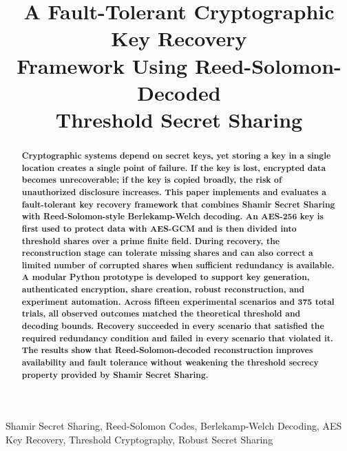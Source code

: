 \documentclass[conference]{IEEEtran}
\begin{document}

\title{A Fault-Tolerant Cryptographic Key Recovery\\
Framework Using Reed-Solomon-Decoded\\
Threshold Secret Sharing}

\author{
}

\maketitle
\thispagestyle{empty}
\vspace{0.5em}

\begin{abstract}
\textbf{Cryptographic systems depend on secret keys, yet storing a key in a single location creates a single point of failure. If the key is lost, encrypted data becomes unrecoverable; if the key is copied broadly, the risk of unauthorized disclosure increases. This paper implements and evaluates a fault-tolerant key recovery framework that combines Shamir Secret Sharing with Reed-Solomon-style Berlekamp-Welch decoding. An AES-256 key is first used to protect data with AES-GCM and is then divided into threshold shares over a prime finite field. During recovery, the reconstruction stage can tolerate missing shares and can also correct a limited number of corrupted shares when sufficient redundancy is available. A modular Python prototype is developed to support key generation, authenticated encryption, share creation, robust reconstruction, and experiment automation. Across fifteen experimental scenarios and 375 total trials, all observed outcomes matched the theoretical threshold and decoding bounds. Recovery succeeded in every scenario that satisfied the required redundancy condition and failed in every scenario that violated it. The results show that Reed-Solomon-decoded reconstruction improves availability and fault tolerance without weakening the threshold secrecy property provided by Shamir Secret Sharing.}
\end{abstract}

\begin{IEEEkeywords}
Shamir Secret Sharing, Reed-Solomon Codes, Berlekamp-Welch Decoding, AES Key Recovery, Threshold Cryptography, Robust Secret Sharing
\end{IEEEkeywords}















\end{document}
